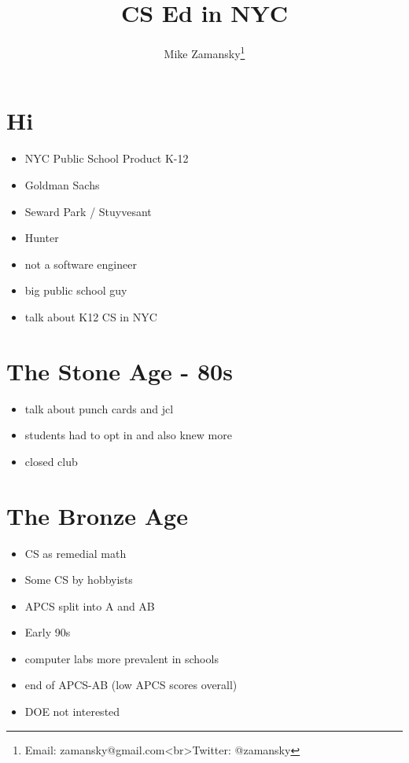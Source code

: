 \documentclass[11pt]{article}
\author{Mike Zamansky\thanks{Email: zamansky@gmail.com<br>Twitter: @zamansky}}
\date{}
\title{CS Ed in NYC}
\begin{document}
\maketitle
\section*{Hi}
\label{sec:org2fc6234}
\begin{itemize}
\item NYC Public School Product K-12
\item Goldman Sachs
\item Seward Park / Stuyvesant
\item Hunter
\end{itemize}
\begin{NOTES}
\begin{itemize}
\item not a software engineer
\item big public school guy
\item talk about K12 CS in NYC
\end{itemize}
\end{NOTES}
\section*{The Stone Age - 80s}
\label{sec:orgaf00f6c}
\begin{NOTES}
\begin{itemize}
\item talk about punch cards and jcl
\item students had to opt in and also knew more
\item closed club
\end{itemize}
\end{NOTES}
\section*{The Bronze Age}
\label{sec:org8c6c940}
\begin{itemize}
\item CS as remedial math
\item Some CS by hobbyists
\item APCS split into A and AB
\end{itemize}
\begin{NOTES}
\begin{itemize}
\item Early 90s
\item computer labs more prevalent in schools
\item end of APCS-AB (low APCS scores overall)
\item DOE not interested
\end{itemize}
\end{NOTES}
\end{document}
